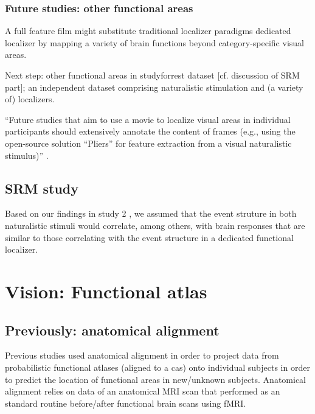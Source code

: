 \subsubsection{Future studies: other functional areas}

%
A full feature film might substitute traditional localizer paradigms dedicated
localizer by mapping a variety of brain functions beyond category-specific
visual areas.

%
Next step: other functional areas in studyforrest dataset [cf. discussion of SRM
part]; an independent dataset comprising naturalistic stimulation and (a variety
of) localizers.

%
``Future studies that aim to use a movie to localize visual areas in individual
participants should extensively annotate the content of frames (e.g., using the
open-source solution ``Pliers''\citep{mcnamara2017developing} for feature
extraction from a visual naturalistic stimulus)''
\citep{haeusler2022processing}.


\subsection{SRM study}

Based on our findings in study 2 \citep{haeusler2022processing}, we assumed that
the event struture in both naturalistic stimuli would correlate, among others,
with brain responses that are similar to those correlating with the event
structure in a dedicated functional localizer.


\section{Vision: Functional atlas}





\subsection{Previously: anatomical alignment}
%
Previous studies used anatomical alignment in order to project data from
probabilistic functional atlases (aligned to a \ac{cas}) onto individual
subjects in order to predict the location of functional areas in new/unknown
subjects.
%
Anatomical alignment relies on data of an anatomical MRI scan that performed as
an standard routine before/after functional brain scans using fMRI.


